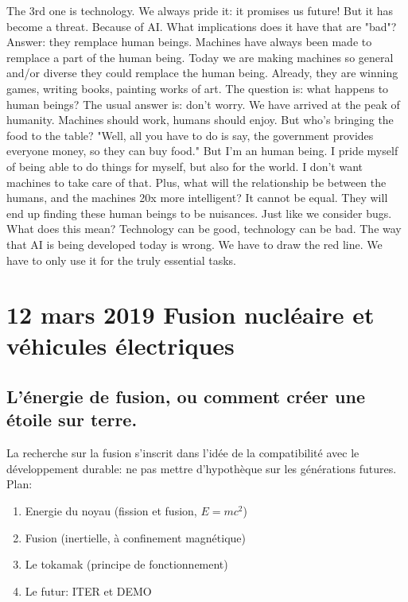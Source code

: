 \documentclass{article}
\begin{document}
The 3rd one is technology. We always pride it: it promises us future! But it has become a threat. Because of AI. What implications does it have that are "bad"? Answer: they remplace human beings. Machines have always been made to remplace a part of the human being. Today we are making machines so general and/or diverse they could remplace the human being. Already, they are winning games, writing books, painting works of art. The question is: what happens to human beings? The usual answer is: don't worry. We have arrived at the peak of humanity. Machines should work, humans should enjoy. But who's bringing the food to the table? "Well, all you have to do is say, the government provides everyone money, so they can buy food." But I'm an human being. I pride myself of being able to do things for myself, but also for the world. I don't want machines to take care of that. Plus, what will the relationship be between the humans, and the machines 20x more intelligent? It cannot be equal. They will end up finding these human beings to be nuisances. Just like we consider bugs. \\
What does this mean? Technology can be good, technology can be bad. The way that AI is being developed today is wrong. We have to draw the red line. We have to only use it for the truly essential tasks.


\section{12 mars 2019 Fusion nucléaire et véhicules électriques}
\subsection{L'énergie de fusion, ou comment créer une étoile sur terre.}
La recherche sur la fusion s'inscrit dans l'idée de la compatibilité avec le développement durable: ne pas mettre d'hypothèque sur les générations futures.
Plan:
\begin{enumerate}
	\item Energie du noyau (fission et fusion, $E = mc^2$)
	\item Fusion (inertielle, à confinement magnétique)
	\item Le tokamak (principe de fonctionnement)
	\item Le futur: ITER et DEMO
\end{enumerate}
\end{document}
